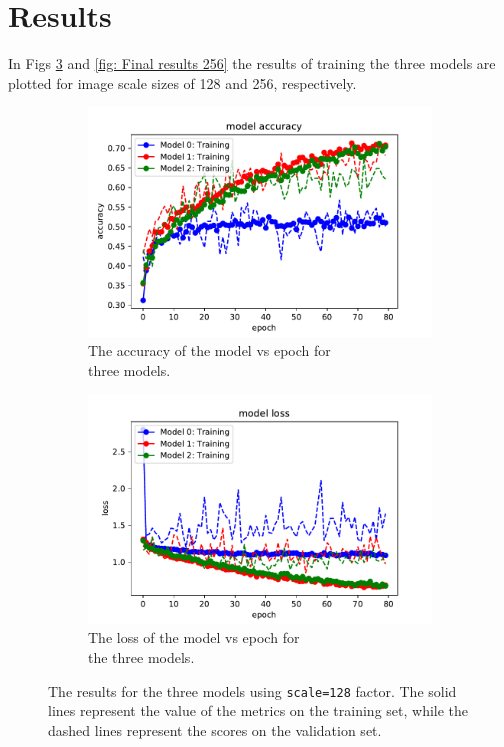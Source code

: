 \documentclass[10pt,a4paper]{article}
\begin{document}
\newpage
\section{Results}
In Figs \ref{fig: Final results 128} and \ref{fig: Final results 256} the results of training the three models are plotted for image scale sizes of 128 and 256, respectively. 

\begin{figure}[h]
\centering
\begin{subfigure}{.7\textwidth}
  \centering
  \includegraphics[scale=0.5]{accuracy_vs_epoch_128.pdf}
  \caption{The accuracy of the model vs epoch for\\ three models.}
  \label{fig:sub1 128}
\end{subfigure}%
\begin{subfigure}{.6\textwidth}
  \centering
  \includegraphics[scale=0.5]{loss_vs_epoch_128.pdf}
  \caption{The loss of the model vs epoch for\\ the three models.}
  \label{fig:sub2 128}
\end{subfigure}
\caption{The results for the three models using \lstinline{scale=128} factor. The solid lines represent the value of the metrics on the training set, while the dashed lines represent the scores on the validation set.}
\label{fig: Final results 128}
\end{figure}
\end{document}
